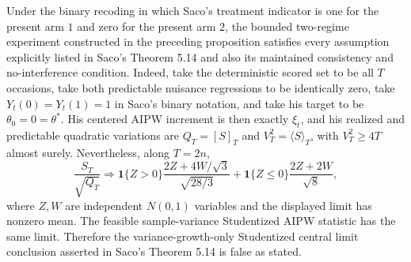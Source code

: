 Under the binary recoding in which Saco's treatment indicator is one for the present arm \(1\) and zero for the present arm \(2\), the bounded two-regime experiment constructed in the preceding proposition satisfies every assumption explicitly listed in Saco's Theorem 5.14 and also its maintained consistency and no-interference condition. Indeed, take the deterministic scored set to be all \(T\) occasions, take both predictable nuisance regressions to be identically zero, take \(Y_t(0)=Y_t(1)=1\) in Saco's binary notation, and take his target to be \(\theta_0=0=\theta^*\). His centered AIPW increment is then exactly \(\xi_t\), and his realized and predictable quadratic variations are \(Q_T=[S]_T\) and \(V_T^2=\langle S\rangle_T\), with \(V_T^2\ge 4T\) almost surely. Nevertheless, along \(T=2n\),
\[
 \frac{S_T}{\sqrt{Q_T}}\Longrightarrow
 \mathbf1\{Z>0\}\frac{2Z+4W/\sqrt3}{\sqrt{28/3}}
 +\mathbf1\{Z\le0\}\frac{2Z+2W}{\sqrt8},
\]
where \(Z,W\) are independent \(N(0,1)\) variables and the displayed limit has nonzero mean. The feasible sample-variance Studentized AIPW statistic has the same limit. Therefore the variance-growth-only Studentized central limit conclusion asserted in Saco's Theorem 5.14 is false as stated.
